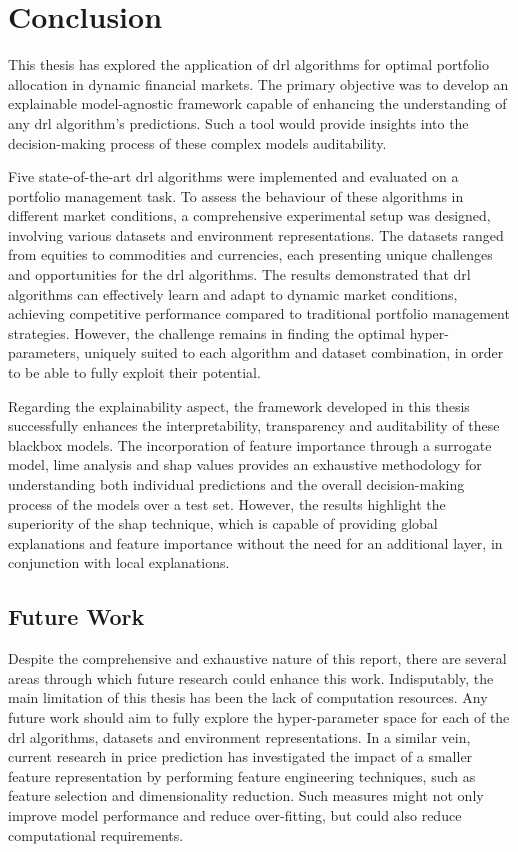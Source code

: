 \chapter{Conclusion} \label{ch:conclusion}

This thesis has explored the application of \acrfull{drl} algorithms for optimal portfolio allocation in dynamic financial markets. The primary objective was to develop an explainable model-agnostic framework capable of enhancing the understanding of any \acrshort{drl} algorithm's predictions. Such a tool would provide insights into the decision-making process of these complex models auditability.

Five state-of-the-art \acrshort{drl} algorithms were implemented and evaluated on a portfolio management task. To assess the behaviour of these algorithms in different market conditions, a comprehensive experimental setup was designed, involving various datasets and environment representations. The datasets ranged from equities to commodities and currencies, each presenting unique challenges and opportunities for the \acrshort{drl} algorithms. The results demonstrated that \acrshort{drl} algorithms can effectively learn and adapt to dynamic market conditions, achieving competitive performance compared to traditional portfolio management strategies. However, the challenge remains in finding the optimal hyper-parameters, uniquely suited to each algorithm and dataset combination, in order to be able to fully exploit their potential.

Regarding the explainability aspect, the framework developed in this thesis successfully enhances the interpretability, transparency and auditability of these \gls{blackbox} models. The incorporation of feature importance through a surrogate model, \acrfull{lime} analysis and \acrfull{shap} values provides an exhaustive methodology for understanding both individual predictions and the overall decision-making process of the models over a test set. However, the results highlight the superiority of the \acrshort{shap} technique, which is capable of providing global explanations and feature importance without the need for an additional layer, in conjunction with local explanations. 

\section{Future Work} \label{sec:future-work}

Despite the comprehensive and exhaustive nature of this report, there are several areas through which future research could enhance this work. Indisputably, the main limitation of this thesis has been the lack of computation resources. Any future work should aim to fully explore the hyper-parameter space for each of the \acrshort{drl} algorithms, datasets and environment representations. In a similar vein, current research in price prediction has investigated the impact of a smaller feature representation by performing feature engineering techniques, such as feature selection and dimensionality reduction. Such measures might not only improve model performance and reduce over-fitting, but could also reduce computational requirements.

